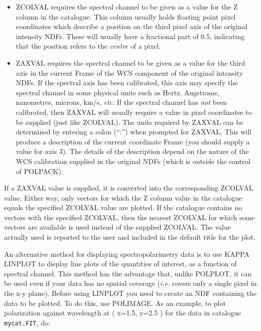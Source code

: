 \documentclass[twoside,11pt]{article}
\newcommand{\htmlref}[2]{#1}
\newcommand{\xref}[3]{#1}
\renewcommand{\_}{\texttt{\symbol{95}}}
\begin{document}
\begin{itemize}

\item ZCOLVAL requires the spectral channel to be given as a value for
the Z column in the catalogue. This column usually holds floating point 
pixel coordinates which describe a position on the third pixel axis of 
the original intensity NDFs. These will usually have a fractional part of
0.5, indicating that the position refers to the \emph{centre} of a pixel.

\item ZAXVAL requires the spectral channel to be given as a value for the 
third axis in the current Frame of the WCS component of the original
intensity NDFs. If the spectral axis has been calibrated, this axis may
specify the spectral channel in some physical units such as Hertz,
Angstroms, nanometres, microns, km/s, \emph{etc}. If the spectral channel
has \emph{not} been calibrated, then ZAXVAL will usually require a value
in pixel coordinates to be supplied (just like ZCOLVAL). The units
required by ZAXVAL can be determined by entering a colon (``:'') when
prompted for ZAXVAL. This will produce a description of the current
coordinate Frame (you should supply a value for axis 3). The details of
the description depend on the nature of the WCS calibration supplied in
the original NDFs (which is outside the control of POLPACK).

\end{itemize}

If a ZAXVAL value is supplied, it is converted into the corresponding
ZCOLVAL value. Either way, only vectors for which the Z column value
in the catalogue equals the specified ZCOLVAL value are plotted. If
the catalogue contains no vectors with the specified ZCOLVAL, then the 
nearest ZCOLVAL for which some vectors are available is used instead of
the supplied ZCOLVAL. The value actually used is reported to the user
and included in the default title for the plot.

An alternative method for displaying spectropolarimetry data is to use
KAPPA \xref{LINPLOT}{sun95}{LINPLOT} to display line plots of the
quantities of interest, as a function of spectral channel. This method
has the advantage that, unlike POLPLOT, it can be used even if your data
has no spatial coverage (\emph{i.e.} covers only a single pixel in the
x-y plane). Before using LINPLOT you need to create an NDF containing the
data to be plotted. To do this, use \htmlref{POLIMAGE}{POLIMAGE}. As an
example, to plot polarization against wavelength at ( x=1.5, y=2.5 ) for
the data in catalogue {\tt mycat.FIT}, do:
\end{document}
